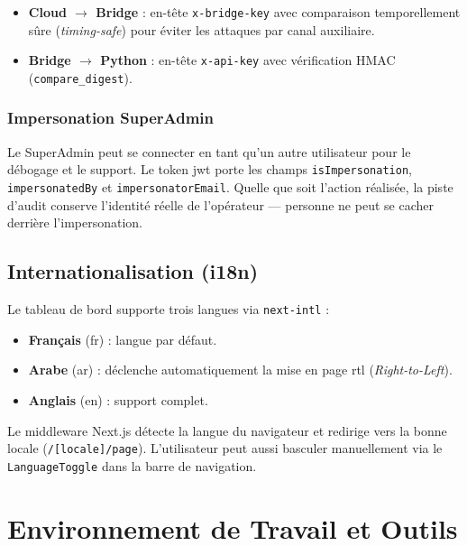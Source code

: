 \documentclass[../main.tex]{subfiles}
\begin{document}
\begin{itemize}
    \item \textbf{Cloud $\rightarrow$ Bridge} : en-t\^{e}te \texttt{x-bridge-key} avec comparaison temporellement s\^{u}re (\textit{timing-safe}) pour \'{e}viter les attaques par canal auxiliaire.
    \item \textbf{Bridge $\rightarrow$ Python} : en-t\^{e}te \texttt{x-api-key} avec v\'{e}rification HMAC (\texttt{compare\_digest}).
\end{itemize}

\subsubsection{Impersonation SuperAdmin}

Le SuperAdmin peut se connecter en tant qu'un autre utilisateur pour le d\'{e}bogage et le support. Le token \acrshort{jwt} porte les champs \texttt{isImpersonation}, \texttt{impersonatedBy} et \texttt{impersonatorEmail}. Quelle que soit l'action r\'{e}alis\'{e}e, la piste d'audit conserve l'identit\'{e} r\'{e}elle de l'op\'{e}rateur --- personne ne peut se cacher derrière l'impersonation.

\subsection{Internationalisation (i18n)}

Le tableau de bord supporte trois langues via \texttt{next-intl} \cite{nextintl} :

\begin{itemize}
    \item \textbf{Fran\c{c}ais} (fr) : langue par d\'{e}faut.
    \item \textbf{Arabe} (ar) : d\'{e}clenche automatiquement la mise en page \acrshort{rtl} (\textit{Right-to-Left}).
    \item \textbf{Anglais} (en) : support complet.
\end{itemize}

Le middleware Next.js d\'{e}tecte la langue du navigateur et redirige vers la bonne locale (\texttt{/[locale]/page}). L'utilisateur peut aussi basculer manuellement via le \texttt{LanguageToggle} dans la barre de navigation.

\section{Environnement de Travail et Outils}
\end{document}
